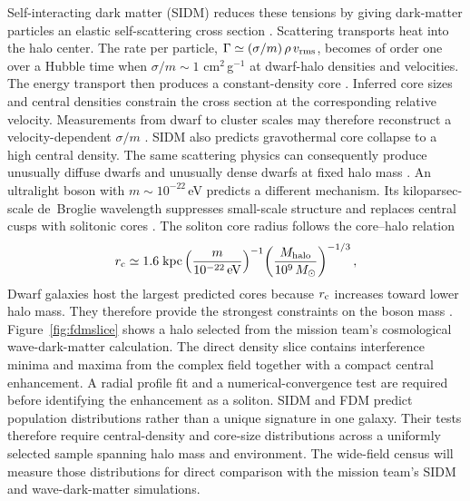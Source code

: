 Self-interacting dark matter (SIDM) reduces these tensions by giving dark-matter particles an elastic self-scattering cross section \cite{spergel2000}. Scattering transports heat into the halo center. The rate per particle, $\Gamma\simeq(\sigma/m)\,\rho\,v_{\rm rms}$, becomes of order one over a Hubble time when $\sigma/m\sim1$ cm$^2$\,g$^{-1}$ at dwarf-halo densities and velocities. The energy transport then produces a constant-density core \cite{tulinyu2018}. Inferred core sizes and central densities constrain the cross section at the corresponding relative velocity. Measurements from dwarf to cluster scales may therefore reconstruct a velocity-dependent $\sigma/m$ \cite{kaplinghat2016}. SIDM also predicts gravothermal core collapse to a high central density. The same scattering physics can consequently produce unusually diffuse dwarfs and unusually dense dwarfs at fixed halo mass \cite{ren2019}. An ultralight boson with $m\sim10^{-22}$\,eV predicts a different mechanism. Its kiloparsec-scale de~Broglie wavelength suppresses small-scale structure and replaces central cusps with solitonic cores \cite{hu2000,schive2014}. The soliton core radius follows the core--halo relation
\begin{equation}
r_{\rm c}\simeq1.6\;{\rm kpc}\left(\frac{m}{10^{-22}\,\rm eV}\right)^{-1}\!\left(\frac{M_{\rm halo}}{10^{9}\,M_\odot}\right)^{-1/3},
\label{eq:soliton}
\end{equation}
Dwarf galaxies host the largest predicted cores because $r_{\rm c}$ increases toward lower halo mass. They therefore provide the strongest constraints on the boson mass \cite{schive2014}. Figure~\ref{fig:fdmslice} shows a halo selected from the mission team's cosmological wave-dark-matter calculation. The direct density slice contains interference minima and maxima from the complex field together with a compact central enhancement. A radial profile fit and a numerical-convergence test are required before identifying the enhancement as a soliton. SIDM and FDM predict population distributions rather than a unique signature in one galaxy. Their tests therefore require central-density and core-size distributions across a uniformly selected sample spanning halo mass and environment. The wide-field census will measure those distributions for direct comparison with the mission team's SIDM and wave-dark-matter simulations.

